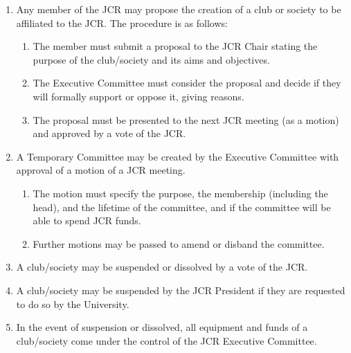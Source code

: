 \documentclass[12pt]{article}  %
\begin{document}
\begin{enumerate}
	\item Any member of the JCR may propose the creation of a club or society to be affiliated to the JCR. The procedure is as follows:
	\begin{enumerate}
		\item The member must submit a proposal to the JCR Chair stating the purpose of the club/society and its aims and objectives.
		\item The Executive Committee must consider the proposal and decide if they will formally support or oppose it, giving reasons.
		\item The proposal must be presented to the next JCR meeting (as a motion) and approved by a vote of the JCR.
	\end{enumerate}
	\item A Temporary Committee may be created by the Executive Committee with approval of a motion of a JCR meeting.
	\begin{enumerate}
		\item The motion must specify the purpose, the membership (including the head), and the lifetime of the committee, and if the committee will be able to spend JCR funds.
		\item Further motions may be passed to amend or disband the committee.
	\end{enumerate}
	\item A club/society may be suspended or dissolved by a vote of the JCR.
	\item A club/society may be suspended by the JCR President if they are requested to do so by the University.
	\item In the event of suspension or dissolved, all equipment and funds of a club/society come under the control of the JCR Executive Committee.
\end{enumerate}
\newpage
\end{document}
